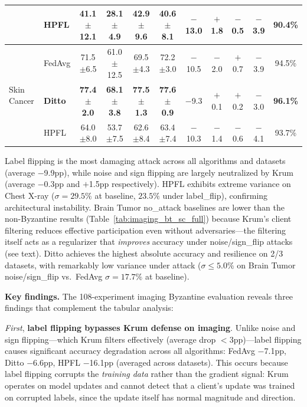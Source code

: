 \documentclass[conference,a4paper]{IEEEtran}
\begin{document}
\begin{table}[htbp]
{\begin{tabular}{ll cccc cccc c}
 & HPFL & 41.1$\pm$12.1 & 28.1$\pm$4.9 & 42.9$\pm$9.6 & 40.6$\pm$8.1 & $-$13.0 & $+$1.8 & $-$0.5 & $-$3.9 & 90.4\% \\
\midrule
\multirow{3}{*}{Skin Cancer} & FedAvg & 71.5$\pm$6.5 & 61.0$\pm$12.5 & 69.5$\pm$4.3 & 72.2$\pm$3.0 & $-$10.5 & $-$2.0 & $+$0.7 & $-$3.9 & 94.5\% \\
 & \textbf{Ditto} & \textbf{77.4$\pm$2.0} & \textbf{68.1$\pm$3.8} & \textbf{77.5$\pm$1.3} & \textbf{77.6$\pm$0.9} & $-$9.3 & $+$0.1 & $+$0.2 & $-$3.0 & \textbf{96.1\%} \\
 & HPFL & 64.0$\pm$8.0 & 53.7$\pm$7.5 & 62.6$\pm$8.4 & 63.4$\pm$7.4 & $-$10.3 & $-$1.4 & $-$0.6 & $-$4.1 & 93.7\% \\
\bottomrule
\end{tabular}%
}
\par{\footnotesize Label flipping is the most damaging attack across all algorithms and datasets (average $-$9.9pp), while noise and sign flipping are largely neutralized by Krum (average $-$0.3pp and $+$1.5pp respectively). HPFL exhibits extreme variance on Chest X-ray ($\sigma{=}29.5\%$ at baseline, $23.5\%$ under label\_flip), confirming architectural instability. Brain Tumor no\_attack baselines are lower than the non-Byzantine results (Table~\ref{tab:imaging_bt_sc_full}) because Krum's client filtering reduces effective participation even without adversaries---the filtering itself acts as a regularizer that \textit{improves} accuracy under noise/sign\_flip attacks (see text). Ditto achieves the highest absolute accuracy and resilience on 2/3 datasets, with remarkably low variance under attack ($\sigma \leq 5.0\%$ on Brain Tumor noise/sign\_flip vs.\ FedAvg $\sigma{=}17.7\%$ at baseline).}
\end{table}

\textbf{Key findings.} The 108-experiment imaging Byzantine evaluation reveals three findings that complement the tabular analysis:

\textit{First}, \textbf{label flipping bypasses Krum defense on imaging}. Unlike noise and sign flipping---which Krum filters effectively (average drop $<$3pp)---label flipping causes significant accuracy degradation across all algorithms: FedAvg $-$7.1pp, Ditto $-$6.6pp, HPFL $-$16.1pp (averaged across datasets). This occurs because label flipping corrupts the \textit{training data} rather than the gradient signal: Krum operates on model updates and cannot detect that a client's update was trained on corrupted labels, since the update itself has normal magnitude and direction.
\end{document}
